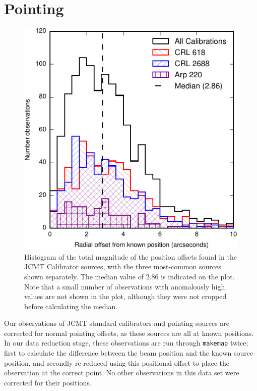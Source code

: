 \documentclass[twocolumn,times]{aastex6}
\begin{document}
\section{Pointing}
\begin{figure}
  \centering
  \includegraphics{pointing-offsets-by-source.pdf}
  \caption{Histogram of the total magnitude of the position offsets
    found in the JCMT Calibrator sources, with the three most-common
    sources shown separately. The median value of 2.86\arcsec{} is
    indicated on the plot. Note that a small number of observations
    with anomalously high values are not shown in the plot, although
    they were not cropped before calculating the median.}
  \label{fig:pointing}
\end{figure}

Our observations of JCMT standard calibrators and pointing sources are
corrected for normal pointing offsets, as these sources are all at
known positions. In our data reduction stage, these observations are
run through \texttt{makemap} twice; first to calculate the difference between
the beam position and the known source position, and secondly
re-reduced using this positional offset to place the observation at
the correct point. No other observations in this data set were
corrected for their positions.
\end{document}
